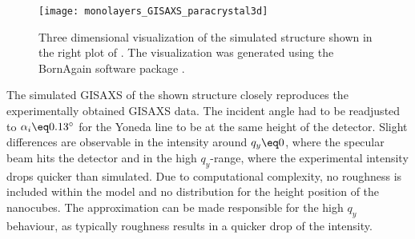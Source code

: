 \documentclass[\main/dresen_thesis.tex]{subfiles}
\begin{document}
  \begin{figure}[tb]
    \centering
    \texttt{[image: monolayers\_GISAXS\_paracrystal3d]}
    \caption{\label{fig:monolayers:structure:paracrystal3d}Three dimensional visualization of the simulated structure shown in the right plot of . The visualization was generated using the BornAgain software package \cite{Burle_2018_borna}.}
  \end{figure}

  The simulated GISAXS of the shown structure closely reproduces the experimentally obtained GISAXS data.
  The incident angle had to be readjusted to $\alpha_i \eq 0.13^\circ$ for the Yoneda line to be at the same height of the detector.
  Slight differences are observable in the intensity around $q_y \eq 0$, where the specular beam hits the detector and in the high $q_y$-range, where the experimental intensity drops quicker than simulated.
  Due to computational complexity, no roughness is included within the model and no distribution for the height position of the nanocubes.
  The approximation can be made responsible for the high $q_y$ behaviour, as typically roughness results in a quicker drop of the intensity.
\end{document}
